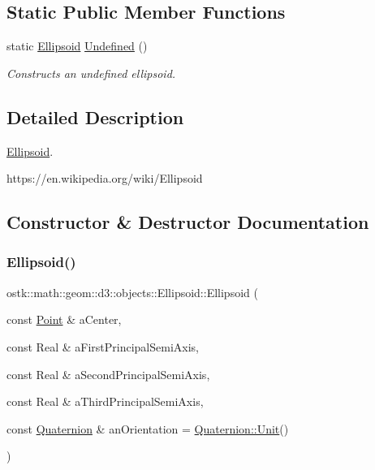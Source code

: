 \subsection*{Static Public Member Functions}
\begin{DoxyCompactItemize}
\item 
static \hyperlink{classostk_1_1math_1_1geom_1_1d3_1_1objects_1_1_ellipsoid}{Ellipsoid} \hyperlink{classostk_1_1math_1_1geom_1_1d3_1_1objects_1_1_ellipsoid_a607399f86f75b9f2c97f05802b0974b2}{Undefined} ()
\begin{DoxyCompactList}\small\item\em Constructs an undefined ellipsoid. \end{DoxyCompactList}\end{DoxyCompactItemize}


\subsection{Detailed Description}
\hyperlink{classostk_1_1math_1_1geom_1_1d3_1_1objects_1_1_ellipsoid}{Ellipsoid}. 

https\+://en.wikipedia.\+org/wiki/\+Ellipsoid 

\subsection{Constructor \& Destructor Documentation}
\mbox{\label{classostk_1_1math_1_1geom_1_1d3_1_1objects_1_1_ellipsoid_acd84276f65a14db12623402a411712b7}} 
\subsubsection{\texorpdfstring{Ellipsoid()}{Ellipsoid()}}
{\footnotesize\ttfamily ostk\+::math\+::geom\+::d3\+::objects\+::\+Ellipsoid\+::\+Ellipsoid (\begin{DoxyParamCaption}\item[{const \hyperlink{classostk_1_1math_1_1geom_1_1d3_1_1objects_1_1_point}{Point} \&}]{a\+Center,  }\item[{const Real \&}]{a\+First\+Principal\+Semi\+Axis,  }\item[{const Real \&}]{a\+Second\+Principal\+Semi\+Axis,  }\item[{const Real \&}]{a\+Third\+Principal\+Semi\+Axis,  }\item[{const \hyperlink{classostk_1_1math_1_1geom_1_1d3_1_1trf_1_1rot_1_1_quaternion}{Quaternion} \&}]{an\+Orientation = {\ttfamily \hyperlink{classostk_1_1math_1_1geom_1_1d3_1_1trf_1_1rot_1_1_quaternion_ad408cbb3545268b2815c15f12abdbc8b}{Quaternion\+::\+Unit}()} }\end{DoxyParamCaption})}



